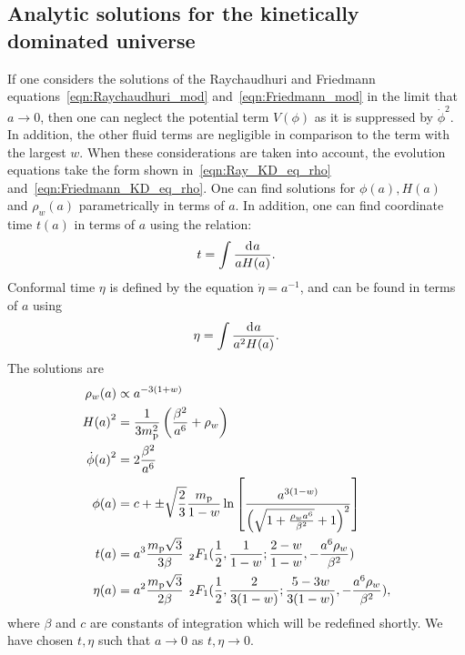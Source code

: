 \subsection{Analytic solutions for the kinetically dominated universe} 
If one considers the solutions of the Raychaudhuri and Friedmann equations~\eqref{eqn:Raychaudhuri_mod} and~\eqref{eqn:Friedmann_mod} in the limit that $a\to0$, then one can neglect the potential term $V(\phi)$ as it is suppressed by $\dot{\phi}^2$. In addition, the other fluid terms are negligible in comparison to the term with the largest $w$.  When these considerations are taken into account, the evolution equations take the form shown in~\eqref{eqn:Ray_KD_eq_rho} and~\eqref{eqn:Friedmann_KD_eq_rho}. One can find solutions for $\phi(a),H(a)$ and $\rho_w(a)$ parametrically in terms of $a$.  In addition, one can find coordinate time $t(a)$ in terms of $a$ using the relation:
%
\begin{equation}
  t = \int \frac{\operatorname{d}^{}\!{a}}{aH(a)}.
\end{equation}
%
Conformal time $\eta$ is defined by the equation $\dot{\eta} =
a^{-1}$, and can be found in terms of $a$ using
%
\begin{equation}
  \eta = \int \frac{\operatorname{d}^{}\!{a}}{a^2H(a)}.
\end{equation}
%
The solutions are
%
\begin{align}
  \rho_w(a) 
  &\propto 
  a^{-3(1+w)} 
  \\
  H{(a)}^2 
  &= 
  \frac{1}{3m_{\mathrm{p}}^2}\left(\frac{\beta^2}{a^6} + \rho_w\right)  
  \label{eqn:H_of_a}
  \\
  \dot{\phi}{(a)}^2
  &=
  2\frac{\beta^2}{a^6} 
  \label{eqn:dotphi_of_a}
  \\
  \phi(a)
  &=
  c + \pm
  \sqrt{\frac{2}{3}}\frac{m_{\mathrm{p}}}{1-w} \ln \left[ 
  \frac 
  {{a}^{3(1-w)}}
  {{\left(\sqrt{1+\frac{\rho_w{a}^{6}}{\beta^2}}+1\right)}^2} 
  \right]  
  \label{eqn:phi_of_a}
  \\
  t(a)
  &=
  a^3 \frac{m_{\mathrm{p}}\sqrt{3}}{3\beta} 
  \:\: 
  {_2F_1}(
  \frac{1}{2},
  \frac{1}{1-w};
  \frac{2-w}{1-w},
  -\frac{a^6\rho_w}{\beta^2}
  ) 
  \label{eqn:t_of_a}
  \\
  \eta(a) 
  &= 
  a^2 \frac{m_{\mathrm{p}}\sqrt{3}}{2\beta}
  \:\: 
  {_2F_1}(
  \frac{1}{2},
  \frac{2}{3(1-w)};
  \frac{5-3w}{3(1-w)},
  -\frac{a^6\rho_w}{\beta^2}
  ),
  \label{eqn:eta_of_a}
\end{align}
%
where $\beta$ and $c$ are constants of integration which will be redefined shortly. We have chosen $t,\eta$ such that $a\to0$ as $t,\eta \to 0$.


